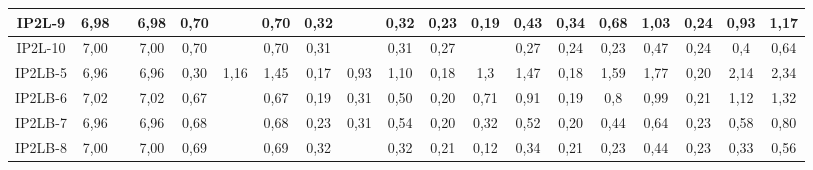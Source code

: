 \begin{table}[h]
{\begin{tabular}{c|c|c|c|c|c|c|c|c|c|c|c|c|c|c|c|c|c|c|}
\multicolumn{1}{|c|}{IP2L-9} & {\color[HTML]{656565} 6,98} & {\color[HTML]{656565} } & 6,98 & {\color[HTML]{656565} 0,70} & {\color[HTML]{656565} } & 0,70 & {\color[HTML]{656565} 0,32} & {\color[HTML]{656565} } & 0,32 & {\color[HTML]{656565} 0,23} & {\color[HTML]{656565} 0,19} & 0,43 & {\color[HTML]{656565} 0,34} & {\color[HTML]{656565} 0,68} & 1,03 & {\color[HTML]{656565} 0,24} & {\color[HTML]{656565} 0,93} & 1,17 \\ \hline
\multicolumn{1}{|c|}{IP2L-10} & {\color[HTML]{656565} 7,00} & {\color[HTML]{656565} } & 7,00 & {\color[HTML]{656565} 0,70} & {\color[HTML]{656565} } & 0,70 & {\color[HTML]{656565} 0,31} & {\color[HTML]{656565} } & 0,31 & {\color[HTML]{656565} 0,27} & {\color[HTML]{656565} } & 0,27 & {\color[HTML]{656565} 0,24} & {\color[HTML]{656565} 0,23} & 0,47 & {\color[HTML]{656565} 0,24} & {\color[HTML]{656565} 0,4} & 0,64 \\ \hline
\multicolumn{1}{|c|}{IP2LB-5} & {\color[HTML]{656565} 6,96} & {\color[HTML]{656565} } & 6,96 & {\color[HTML]{656565} 0,30} & {\color[HTML]{656565} 1,16} & 1,45 & {\color[HTML]{656565} 0,17} & {\color[HTML]{656565} 0,93} & 1,10 & {\color[HTML]{656565} 0,18} & {\color[HTML]{656565} 1,3} & 1,47 & {\color[HTML]{656565} 0,18} & {\color[HTML]{656565} 1,59} & 1,77 & {\color[HTML]{656565} 0,20} & {\color[HTML]{656565} 2,14} & 2,34 \\ \hline
\multicolumn{1}{|c|}{IP2LB-6} & {\color[HTML]{656565} 7,02} & {\color[HTML]{656565} } & 7,02 & {\color[HTML]{656565} 0,67} & {\color[HTML]{656565} } & 0,67 & {\color[HTML]{656565} 0,19} & {\color[HTML]{656565} 0,31} & 0,50 & {\color[HTML]{656565} 0,20} & {\color[HTML]{656565} 0,71} & 0,91 & {\color[HTML]{656565} 0,19} & {\color[HTML]{656565} 0,8} & 0,99 & {\color[HTML]{656565} 0,21} & {\color[HTML]{656565} 1,12} & 1,32 \\ \hline
\multicolumn{1}{|c|}{IP2LB-7} & {\color[HTML]{656565} 6,96} & {\color[HTML]{656565} } & 6,96 & {\color[HTML]{656565} 0,68} & {\color[HTML]{656565} } & 0,68 & {\color[HTML]{656565} 0,23} & {\color[HTML]{656565} 0,31} & 0,54 & {\color[HTML]{656565} 0,20} & {\color[HTML]{656565} 0,32} & 0,52 & {\color[HTML]{656565} 0,20} & {\color[HTML]{656565} 0,44} & 0,64 & {\color[HTML]{656565} 0,23} & {\color[HTML]{656565} 0,58} & 0,80 \\ \hline
\multicolumn{1}{|c|}{IP2LB-8} & {\color[HTML]{656565} 7,00} & {\color[HTML]{656565} } & 7,00 & {\color[HTML]{656565} 0,69} & {\color[HTML]{656565} } & 0,69 & {\color[HTML]{656565} 0,32} & {\color[HTML]{656565} } & 0,32 & {\color[HTML]{656565} 0,21} & {\color[HTML]{656565} 0,12} & 0,34 & {\color[HTML]{656565} 0,21} & {\color[HTML]{656565} 0,23} & 0,44 & {\color[HTML]{656565} 0,23} & {\color[HTML]{656565} 0,33} & 0,56 \\ \hline

\end{tabular}}
\end{table}

